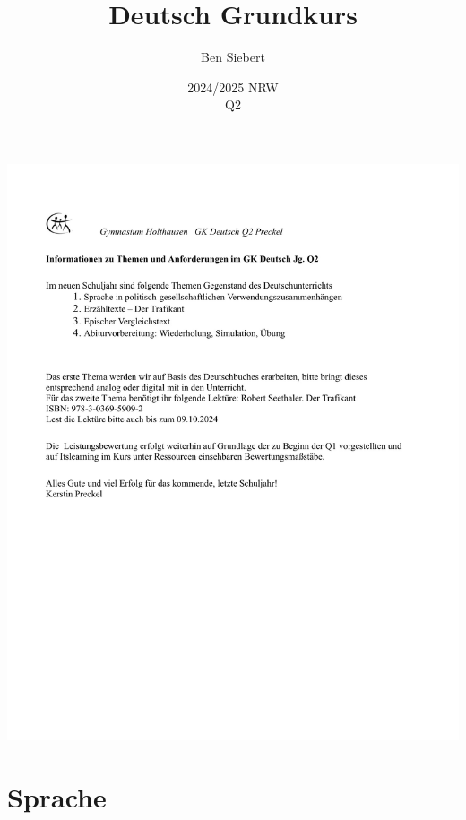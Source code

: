 \documentclass[12pt,a4paper]{report}
\begin{document}
	\title{Deutsch Grundkurs}
	\author{Ben Siebert}
	\date{2024/2025 NRW \\ Q2}
	\maketitle
	\tableofcontents
	\newpage
	\includegraphics[width=\textwidth]{Einfuehrung.jpg}
	\chapter{Sprache}
\end{document}
